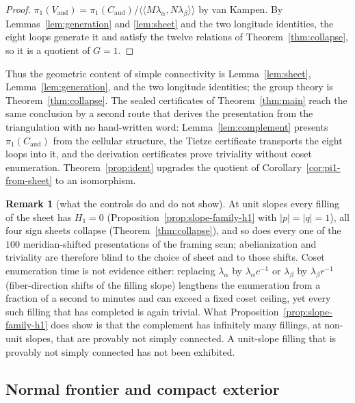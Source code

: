 \documentclass[11pt]{article}
\newcommand{\pione}{\pi_1}
\theoremstyle{definition}
\newtheorem{remark}[theorem]{Remark}
\begin{document}
\begin{proof}
$\pione(V_{\mathrm{aud}})=\pione(C_{\mathrm{aud}})/\langle\!\langle M\lambda_\alpha,N\lambda_\beta\rangle\!\rangle$
by van Kampen.  By Lemmas~\ref{lem:generation} and \ref{lem:sheet} and the
two longitude identities, the eight loops generate it and satisfy the twelve
relations of Theorem~\ref{thm:collapse}, so it is a quotient of $G=1$.
\end{proof}

Thus the geometric content of simple connectivity is Lemma~\ref{lem:sheet},
Lemma~\ref{lem:generation}, and the two longitude identities; the group
theory is Theorem~\ref{thm:collapse}.  The sealed certificates of
Theorem~\ref{thm:main} reach the same conclusion by a second route that
derives the presentation from the triangulation with no hand-written word:
Lemma~\ref{lem:complement} presents $\pione(C_{\mathrm{aud}})$ from the
cellular structure, the Tietze certificate transports the eight loops into
it, and the derivation certificates prove triviality without coset
enumeration.  Theorem~\ref{prop:ident} upgrades the quotient of
Corollary~\ref{cor:pi1-from-sheet} to an isomorphism.

\begin{remark}[what the controls do and do not show]\label{rem:controls}
At unit slopes every filling of the sheet has $H_1=0$
(Proposition~\ref{prop:slope-family-h1} with $|p|=|q|=1$), all four sign
sheets collapse (Theorem~\ref{thm:collapse}), and so does every one of the
$100$ meridian-shifted presentations of the framing scan; abelianization
and triviality are therefore blind to the choice of sheet and to those
shifts.  Coset enumeration time is not evidence either: replacing
$\lambda_\alpha$ by $\lambda_\alpha c^{-1}$ or $\lambda_\beta$ by
$\lambda_\beta r^{-1}$ (fiber-direction shifts of the filling slope)
lengthens the enumeration from a fraction of a second to minutes and can
exceed a fixed coset ceiling, yet every such filling that has completed is
again trivial.  What Proposition~\ref{prop:slope-family-h1} does show is
that the complement has infinitely many fillings, at non-unit slopes, that
are provably not simply connected.  A unit-slope filling that is provably
not simply connected has not been exhibited.
\end{remark}


\subsection{Normal frontier and compact exterior}
\end{document}
